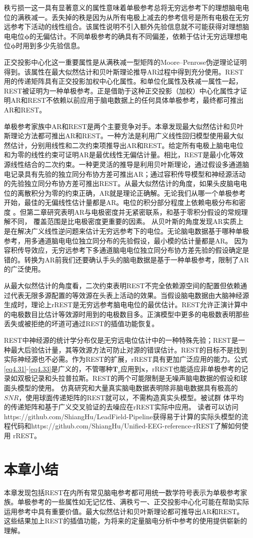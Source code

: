 秩亏损一这一具有显著意义的属性意味着单极参考总将无穷远参考下的理想脑电电位的满秩减一。丢失掉的秩是因为从所有电极上减去的参考信号是所有电极在无穷远参考下活动的线性组合。该属性说明不引入额外先验信息就不可能获得对理想脑电电位$\mathbf{\phi}$的无偏估计。不同单极参考的确具有不同偏差，依赖于估计无穷远理想电位$\mathbf{\phi}$时用到多少先验信息。

正交投影中心化这一重要属性是从满秩减一型矩阵的Moore–Penrose伪逆理论证明得到。该属性在最大似然估计和贝叶斯理论推导AR过程中得到充分使用。REST用的传递矩阵具有正交投影加权中心化属性。和单位化属性及秩减一属性一起，REST被证明为一种单极参考。正是借助于这种正交投影（加权）中心化属性才证明AR和REST不依赖以前应用于脑电数据上的任何具体单极参考，最终都可推出AR和REST。

单极参考家族中AR和REST是两个主要竞争对手。本章发现最大似然估计和贝叶斯理论方法都可推出AR和REST。一种方法是利用广义线性回归模型使用最大似然估计，分别用线性和二次约束项推导出AR和REST。给定所有电极上脑电电位和为零的线性约束可证明AR是最优线性无偏估计量。相比，REST是最小化等效源线性结合的二次约束。一种更灵活的推导是利用贝叶斯理论，通过假设多通道脑电记录具有先验的独立同分布协方差可推出AR；通过容积传导模型和神经源活动的先验独立同分布协方差可推出REST。从最大似然估计的角度，如果头皮脑电电位的离散积分为零的约束正确，AR就是理论正确解。无论我们从哪一个单极参考开始，最佳的无偏线性估计量都是AR。电位的积分部分程度上依赖电极分布和密度
。但第二章研究表明AR与电极密度并无紧密联系，和基于零积分假设的常规理解不同，
覆盖范围是比电极密度更重要的因素。 从贝叶斯的角度发现AR实质上是在解决广义线性逆问题来估计无穷远参考下的电位。无论脑电数据基于哪种单极参考，用多通道脑电电位独立同分布的先验假设，最小模的估计量都是AR。 因为容积传导效应，无穷远参考下多通道脑电电位独立同分布协方差先验的假设确定是错的。转换为AR前我们还要确认手头的脑电数据是基于一种单极参考，限制了AR的广泛使用。

从最大似然估计的角度看，二次约束表明REST不完全依赖源空间的配置但依赖通过代表无限多源配置的等效源在头表上活动的效果。当假设脑电数据由大脑神经源生成时，理论上rREST是无穷远参考脑电电位的最优估计。REST允许正演计算中的电极数目比估计等效源时用到的电极数目多。正演模型中更多的电极数表明那些丢失或被拒绝的坏道可通过REST的插值功能恢复。

REST中神经源的统计学分布仅是无穷远电位估计中的一种特殊先验；REST是一种最大后验估计量，其等效源方法可防止对源的错误估计。REST的目标不是找到实际神经源也不必需。作为REST的扩展，rREST具有更加广泛应用的能力。公式 \eqref{eq4.31}-\eqref{eq4.33}是广义的，不管哪种$\mathbf{T}_o$应用到$\mathbf{x}$，rREST也能适应非单极参考的记录如双极记录和头拉普拉斯。REST的两个可能限制是无噪声脑电数据的假设和球
面头模型的使用。 仿真研究和大量真实脑电数据表明除非脑电数据具有极高的$SNR$，使用球面传递矩阵的REST就可以，不需构造真实头模型。被试群
体平均的传递矩阵和基于广义交叉验证的去噪应在rREST实际中应用。 读者可以访问https://github.com/ShiangHu/LeadField-Pipeline获得易于计算的实际头模型的流程代码和https://github.com/ShiangHu/Unified-EEG-reference-rREST了解如何使用
rREST。
\section{本章小结}
本章发现包括REST在内所有常见脑电参考都可用统一数学符号表示为单极参考家族。单极参考的一些属性如无记忆性、满秩亏一、正交投影中心化可能在帮助实际运用参考中具有重要价值。最大似然估计和贝叶斯理论都可推导出AR和REST。这些结果加上REST的插值功能，为将来的定量脑电分析中参考的使用提供崭新的理解。